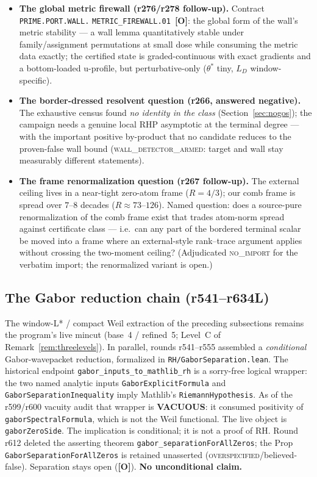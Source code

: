 \documentclass[11pt]{article}
\newcommand{\mO}{\textcolor{openred}{\textbf{[O]}}}
\theoremstyle{definition}
\theoremstyle{remark}
\begin{document}
\begin{itemize}[leftmargin=2em]
mechanism is two-scale (Remark~\ref{rem:twoscale}); return later
with new tools --- per the hard reviewer rule a round counts only
with new information, no further coordinate change counts.
\item \textbf{The global metric firewall (r276/r278 follow-up).}
Contract \texttt{PRIME.PORT.WALL.}\allowbreak
\texttt{METRIC\_FIREWALL.01}~\mO: the global form of the wall's metric
stability --- a wall lemma quantitatively stable under family/assignment
permutations at small dose while consuming the metric data exactly; the
certified state is graded-continuous with exact gradients and a
bottom-loaded u-profile, but perturbative-only ($\theta^*$ tiny, $L_D$
window-specific).
\item \textbf{The border-dressed resolvent question (r266, answered
negative).}  The exhaustive census found \emph{no identity in the class}
(Section~\ref{sec:nogos}); the campaign needs a genuine local RHP
asymptotic at the terminal degree --- with the important positive
by-product that no candidate reduces to the proven-false wall bound
(\textsc{wall\_detector\_armed}: target and wall stay measurably
different statements).
\item \textbf{The frame renormalization question (r267 follow-up).}
The external ceiling lives in a near-tight zero-atom frame
($R=4/3$); our comb frame is spread over $7$--$8$ decades
($R\approx73$--$126$).  Named question: does a source-pure renormalization
of the comb frame exist that trades atom-norm spread against certificate
class --- i.e.\ can any part of the bordered terminal scalar be moved into
a frame where an external-style rank--trace argument applies without
crossing the two-moment ceiling?  (Adjudicated \textsc{no\_import} for the
verbatim import; the renormalized variant is open.)
\end{itemize}

\subsection{The Gabor reduction chain (r541--r634L)}\label{sec:gabor}

The window-L* / compact Weil extraction of the preceding subsections
remains the program's live mincut (base~4 / refined~5; Level~C of
Remark~\ref{rem:threelevels}).  In parallel, rounds r541--r555 assembled a
\emph{conditional} Gabor-wavepacket reduction, formalized in
\texttt{RH/GaborSeparation.lean}.  The historical endpoint
\texttt{gabor\_inputs\_to\_mathlib\_rh} is a sorry-free logical wrapper:
the two named analytic inputs \texttt{GaborExplicitFormula} and
\texttt{GaborSeparationInequality} imply Mathlib's
\texttt{RiemannHypothesis}.  As of the r599/r600 vacuity audit that
wrapper is \textbf{VACUOUS}: it consumed positivity of
\texttt{gaborSpectralFormula}, which is not the Weil functional.
The live object is \texttt{gaborZeroSide}.  The implication is
conditional; it is not a proof of RH.  Round r612 deleted the
asserting theorem \texttt{gabor\_separationForAllZeros}; the Prop
\texttt{GaborSeparationForAllZeros} is retained unasserted
(\textsc{overspecified}/believed-false).  Separation stays
open (\mO).  \textbf{No unconditional claim.}
\end{document}
